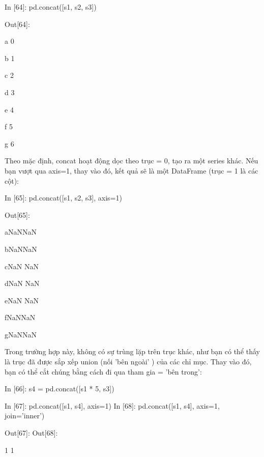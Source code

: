     \par\quad\textup In [64]: pd.concat([s1, s2, s3])
    \par\quad\textup Out[64]: 
    \par\quad\textup a 0
    \par\quad\textup b 1
    \par\quad\textup c 2
    \par\quad\textup d 3
    \par\quad\textup e 4
    \par\quad\textup f 5
    \par\quad\textup g 6
    \par Theo mặc định, concat hoạt động dọc theo trục = 0, tạo ra một series khác. Nếu bạn vượt qua axis=1, thay vào đó, kết quả sẽ là một DataFrame (trục = 1 là các cột):
    \par\quad\textup  In [65]: pd.concat([s1, s2, s3], axis=1)
    \par\quad\textup Out[65]:
\par\quad\textup\quad{}\quad\quad\quad{}\quad\quad\quad{}
\par\quad\textup a\quad{}\quad\quad NaN\quad\quad NaN
\par\quad\textup b\quad{}\quad\quad NaN\quad\quad NaN
\par\quad\textup c\quad NaN \quad\quad{}\quad\quad NaN
\par\quad\textup d\quad NaN \quad\quad{}\quad\quad NaN
\par\quad\textup e\quad NaN \quad\quad{}\quad\quad NaN
\par\quad\textup f\quad NaN\quad\quad NaN\quad\quad{}
\par\quad\textup g\quad NaN\quad\quad NaN\quad\quad{}
    \par Trong trường hợp này, không có sự trùng lặp trên trục khác, như bạn có thể thấy là trục đã được sắp xếp union (nối 'bên ngoài' ) của các chỉ mục. Thay vào đó, bạn có thể cắt chúng bằng cách đi qua tham gia = 'bên trong':
    \par\quad\textup In [66]: s4 = pd.concat([s1 * 5, s3]) 
    \par\quad\textup In [67]: pd.concat([s1, s4], axis=1) \quad\quad\quad In [68]: pd.concat([s1, s4], axis=1, join='inner') 
    \par\quad\textup Out[67]: \quad\quad\quad\quad\quad\quad\quad\quad\quad\quad\quad\quad\quad \xspace Out[68]:
    \par\quad\quad\xspace\xspace 0\xspace 1 \quad\quad\quad\quad\quad\quad\quad\quad\quad\quad\quad\quad\quad\quad\xspace 0\xspace 1
